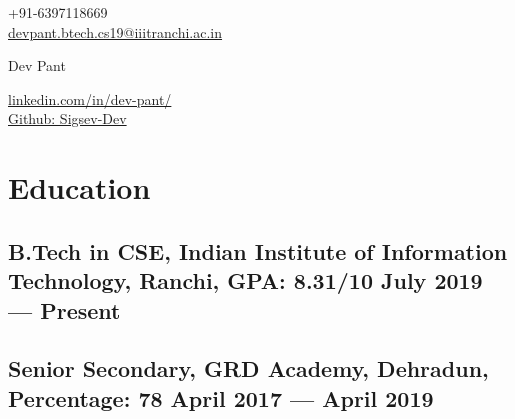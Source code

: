 \documentclass[a4,10pt]{article}
\begin{document}
\begin{center}
    \begin{minipage}[b]{0.24\textwidth}
            \large +91-6397118669 \\
            \large \href{mailto:devpant.btech.cs19@iiitranchi.ac.in}{devpant.btech.cs19@iiitranchi.ac.in} 
    \end{minipage}%
    \begin{minipage}[b]{0.5\textwidth}
            \centering
            {\Huge Dev Pant} \\ %
          
    \end{minipage}%
    \begin{minipage}[b]{0.24\textwidth}
            \flushright \large  %
            {\href{https://www.linkedin.com/in/dev-pant/}{linkedin.com/in/dev-pant/} } \\
            \href{https://github.com/Sigsev-Dev}{Github: Sigsev-Dev}
    \end{minipage}   
    
\vspace{-0.15cm} 

\end{center}
\vspace{-0.25cm}

\vspace{-0.2cm}


\section{Education }
\subsection*{B.Tech in CSE, {\normalsize \normalfont Indian Institute of Information Technology, Ranchi, GPA: 8.31/10} \hfill July 2019 --- Present} 
\vspace{0.1cm}
\subsection*{Senior Secondary, {\normalsize \normalfont GRD Academy, Dehradun, Percentage: 78 } \hfill April 2017 --- April 2019} 
\vspace{0.1cm}
\end{document}
